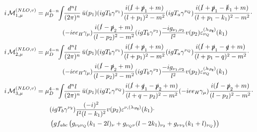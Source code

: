 \begin{align}
i\Md^{(NLO,v)}_{1,\mu} &=\mu_D^{4-n}\!\!\int\!\!\frac{d^nl}{(2\pi)^n}\,\bar u(p_1)(igT_b\gamma^{\nu_1})\frac{i(\slashed{l}+\slashed{p}_1+m)}{(l+p_1)^2-m^2}(igT_a\gamma^{\nu_Q})\frac{i(\slashed{l}+\slashed{p}_1-\slashed{k}_1+m)}{(l+p_1-k_1)^2-m^2}\cdot\nonumber\\
 &\hspace{40pt}(-i e e_H \gamma_\mu)\frac{i(\slashed{l}-\slashed{p}_2+m)}{(l-p_2)^2-m^2}(igT_b\gamma^{\nu_2})\frac{-ig_{\nu_1,\nu_2}}{l^2}v(p_2)\varepsilon^{(\lambda_{\Pg})}_{\nu_Q}(k_1)\\
i\Md^{(NLO,v)}_{2,\mu} &= \mu_D^{4-n}\!\!\int\!\!\frac{d^nl}{(2\pi)^n}\,\bar u(p_1)(igT_b\gamma^{\nu_1})\frac{i(\slashed{l}+\slashed{p}_1+m)}{(l+p_1)^2-m^2}(igT_a\gamma^{\nu_Q})\frac{i(\slashed{l}+\slashed{p}_1-\slashed{q}+m)}{(l+p_1-q)^2-m^2}\cdot\nonumber\\
 &\hspace{40pt}(-i e e_H \gamma_\mu)\frac{i(\slashed{l}-\slashed{p}_2+m)}{(l-p_2)^2-m^2}(igT_b\gamma^{\nu_2})\frac{-ig_{\nu_1,\nu_2}}{l^2}v(p_2)\varepsilon^{(\lambda_{\Pg})}_{\nu_Q}(k_1)\\
i\Md^{(NLO,v)}_{3,\mu} &=\mu_D^{4-n}\!\!\int\!\!\frac{d^nl}{(2\pi)^n}\,\bar u(p_1)(igT_c\gamma^{\nu_Q})\frac{i(\slashed{l}+\slashed{q}_1-\slashed{p}_2+m)}{(l+q-p_2)^2-m^2}(-i e e_H \gamma_\mu)\frac{i(\slashed{l}-\slashed{p}_2+m)}{(l-p_2)^2-m^2}\cdot\nonumber\\
 &\hspace{20pt}(igT_b\gamma^{\nu_2})\frac{(-i)^2}{l^2(l-k_1)^2}v(p_2)\varepsilon^{\nu,(\lambda_{\Pg})}(k_1)\cdot\nonumber\\
 &\hspace{20pt}\left(gf_{abc}\left(g_{\nu_2\nu_Q}(k_1-2l)_\nu+g_{\nu_Q\nu}(l-2k_1)_{\nu_2}+g_{\nu\nu_2}(k_1+l)_{\nu_Q}\right)\right)
\end{align}

\pagebreak

